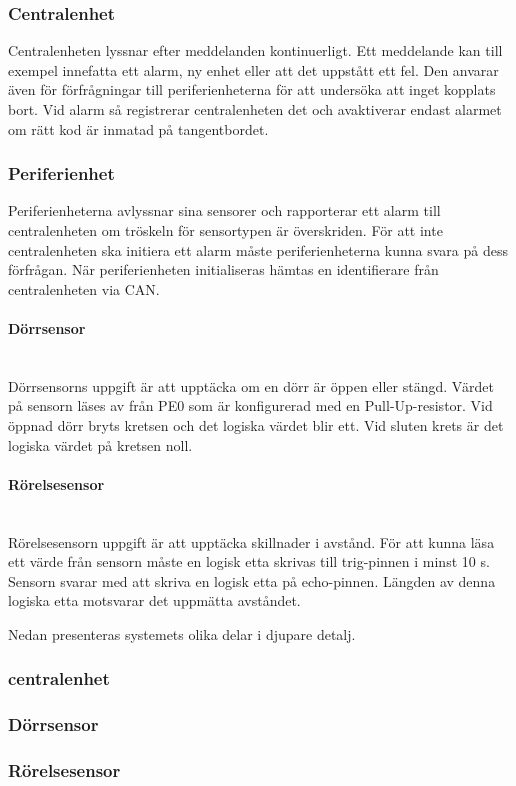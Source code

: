 \documentclass[a4paper]{article}
\newcommand{\subsubsubsection}[1]{\paragraph{#1}\mbox{}\\}
\begin{document}
\subsubsection{Centralenhet}
Centralenheten lyssnar efter meddelanden kontinuerligt.
Ett meddelande kan till exempel innefatta ett alarm, ny enhet eller att det uppstått ett fel.
Den anvarar även för förfrågningar till periferienheterna för att undersöka att inget kopplats bort.
Vid alarm så registrerar centralenheten det och avaktiverar endast alarmet om rätt kod är inmatad på tangentbordet.

\subsubsection{Periferienhet}
Periferienheterna avlyssnar sina sensorer och rapporterar ett alarm till centralenheten om tröskeln för sensortypen är överskriden.
För att inte centralenheten ska initiera ett alarm måste periferienheterna kunna svara på dess förfrågan.
När periferienheten initialiseras hämtas en identifierare från centralenheten via CAN.

\subsubsubsection{Dörrsensor}
Dörrsensorns uppgift är att upptäcka om en dörr är öppen eller stängd.
Värdet på sensorn läses av från PE0 som är konfigurerad med en Pull-Up-resistor.
Vid öppnad dörr bryts kretsen och det logiska värdet blir ett.
Vid sluten krets är det logiska värdet på kretsen noll.

\subsubsubsection{Rörelsesensor}
Rörelsesensorn uppgift är att upptäcka skillnader i avstånd.
För att kunna läsa ett värde från sensorn måste en logisk etta skrivas till trig-pinnen i minst 10 \textmu s.
Sensorn svarar med att skriva en logisk etta på echo-pinnen.
Längden av denna logiska etta motsvarar det uppmätta avståndet.

Nedan presenteras systemets olika delar i djupare detalj.

\subsubsection{centralenhet}

\subsubsection{Dörrsensor}

\subsubsection{Rörelsesensor}
\end{document}
